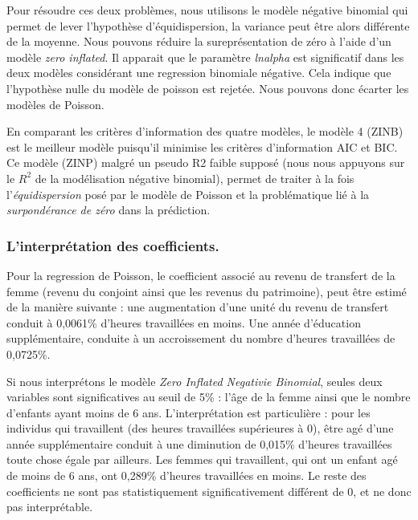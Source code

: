 \vspace*{0.3cm}

Pour résoudre ces deux problèmes, nous utilisons le modèle négative binomial qui permet de lever l'hypothèse d'équidispersion, la variance peut être alors différente de la moyenne. Nous pouvons réduire la sureprésentation de zéro à l'aide d'un modèle \emph{zero inflated}. Il apparait que le paramètre \emph{lnalpha} est significatif dans les deux modèles considérant une regression binomiale négative. Cela indique que l'hypothèse nulle du modèle de poisson est rejetée. Nous pouvons donc écarter les modèles de Poisson. 

\vspace*{0.3cm}

En comparant les critères d'information des quatre modèles, le modèle 4 (ZINB) est le meilleur modèle puisqu'il minimise les critères d'information AIC et BIC. Ce modèle (ZINP) malgré un pseudo R2 faible supposé (nous nous appuyons sur le $R^2$ de la modélisation négative binomial), permet de traiter à la fois l'\emph{équidispersion} posé par le modèle de Poisson et la problématique lié à la \emph{surpondérance de zéro} dans la prédiction. 

\subsubsection*{L'interprétation des coefficients.}

Pour la regression de Poisson, le coefficient associé au revenu de transfert de la femme (revenu du conjoint ainsi que les revenus du patrimoine), peut être estimé de la manière suivante : une augmentation d'une unité du revenu de transfert conduit à 0,0061\% d'heures travaillées en moins. Une année d'éducation supplémentaire, conduite à un accroissement du nombre d'heures travaillées de 0,0725\%.

\vspace*{0.3cm}

Si nous interprétons le modèle \emph{Zero Inflated Negativie Binomial}, seules deux variables sont significatives au seuil de 5\% : l'âge de la femme ainsi que le nombre d'enfants ayant moins de 6 ans. L'interprétation est particulière : pour les individus qui travaillent (des heures travaillées supérieures à 0), être agé d'une année supplémentaire conduit à une diminution de 0,015\% d'heures travaillées toute chose égale par ailleurs. Les femmes qui travaillent, qui ont un enfant agé de moins de 6 ans, ont 0,289\% d'heures travaillées en moins. Le reste des coefficients ne sont pas statistiquement significativement différent de 0, et ne donc pas interprétable.